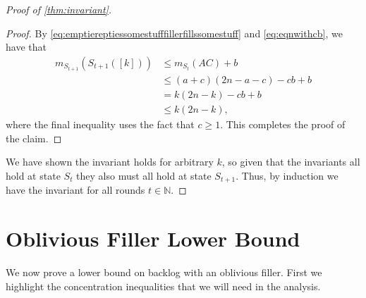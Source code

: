 \documentclass[twocolumn]{article}[10pt]
\begin{document}
\begin{proof}[Proof of \cref{thm:invariant}]
\begin{proof}
By \eqref{eq:emptiereptiessomestufffillerfillssomestuff} and \eqref{eq:eqnwithcb}, we have that
\begin{align*}
    m_{S_{t+1}}(S_{t + 1}([k])) & \le m_{S_t}(AC) + b \\
                                & \le (a+c)(2n-a-c) - cb + b \\
                                & = k(2n-k) - cb + b \\
                                & \le k(2n-k),
\end{align*}
where the final inequality uses the fact that $c \ge 1$. This completes the proof of the claim. 
  
\end{proof}

We have shown the invariant holds for arbitrary $k$, so given that the
invariants all hold at state $S_t$ they also must all hold at state $S_{t+1}$.
Thus, by induction we have the invariant for all rounds $t\in\mathbb{N}$.
\end{proof}



\section{Oblivious Filler Lower Bound}\label{sec:oblivious}
We now prove a lower bound on backlog with an oblivious filler. First we
highlight the concentration inequalities that we will need in the analysis. 
\end{document}
